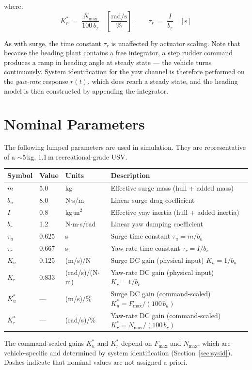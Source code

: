 \documentclass[../../book.tex]{subfiles}
\begin{document}
where:
\[
  K_r^* \;=\; \frac{N_{\max}}{100\,b_r}
  \quad \left[\frac{\mathrm{rad/s}}{\%}\right],
  \qquad
  \tau_r \;=\; \frac{I}{b_r} \quad [\mathrm{s}]
\]

As with surge, the time constant $\tau_r$ is unaffected by actuator
scaling.  Note that because the heading plant contains a free integrator,
a step rudder command produces a ramp in heading angle at steady state ---
the vehicle turns continuously.  System identification for the yaw channel
is therefore performed on the \emph{yaw-rate} response $r(t)$, which does
reach a steady state, and the heading model is then constructed by
appending the integrator.

\section{Nominal Parameters}

The following lumped parameters are used in simulation.  They are
representative of a \(\sim\)5\,kg, 1.1\,m recreational-grade USV.

\vspace{6pt}
\begin{center}
\begin{tabular}{C{1.5cm} C{1.5cm} C{2.8cm} L{7.4cm}}
  \textbf{Symbol} & \textbf{Value} & \textbf{Units} & \textbf{Description} \\
  \midrule
  $m$       & 5.0   & kg                    & Effective surge mass (hull + added mass) \\
  $b_u$     & 8.0   & N$\cdot$s/m           & Linear surge drag coefficient \\
  $I$       & 0.8   & kg$\cdot$m$^2$        & Effective yaw inertia (hull + added inertia) \\
  $b_r$     & 1.2   & N$\cdot$m$\cdot$s/rad & Linear yaw damping coefficient \\
  $\tau_u$  & 0.625 & s                     & Surge time constant $\tau_u = m/b_u$ \\
  $\tau_r$  & 0.667 & s                     & Yaw-rate time constant $\tau_r = I/b_r$ \\
  $K_u$     & 0.125 & (m/s)/N               & Surge DC gain (physical input) $K_u = 1/b_u$ \\
  $K_r$     & 0.833 & (rad/s)/(N$\cdot$m)   & Yaw-rate DC gain (physical input) $K_r = 1/b_r$ \\
  $K_u^*$   & ---   & (m/s)/\%              & Surge DC gain (command-scaled) $K_u^* = F_{\max}/(100\,b_u)$ \\
  $K_r^*$   & ---   & (rad/s)/\%            & Yaw-rate DC gain (command-scaled) $K_r^* = N_{\max}/(100\,b_r)$ \\
  \bottomrule
\end{tabular}
\end{center}
\vspace{3pt}
{\small The command-scaled gains $K_u^*$ and $K_r^*$ depend on $F_{\max}$ and
$N_{\max}$, which are vehicle-specific and determined by system identification
(Section~\ref{sec:sysid}).  Dashes indicate that nominal values are not
assigned a priori.}
\vspace{6pt}
\end{document}
